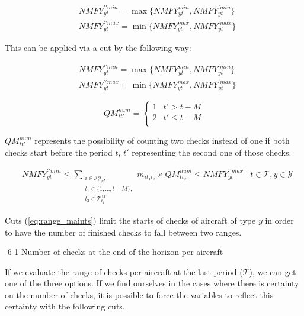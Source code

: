 \documentclass[a4paper,onecolumn,fleqn]{article}
\makeatletter
\renewcommand\section{\@startsection{section}{1}{\z@}%
                       {-6\p@ \@plus -0\p@ \@minus -0\p@}%
                       {2\p@ \@plus 0\p@ \@minus 0\p@}%
                       {\normalsize\textbf}}
\renewcommand\section{\@startsection{section}{2}{\z@}%
                       {-6\p@ \@plus -0\p@ \@minus -0\p@}%
                       {2\p@ \@plus 0\p@ \@minus 0\p@}%
                       {\normalsize\textbf}}
\renewcommand\section{\@startsection{section}{3}{\z@}%
                       {-6\p@ \@plus -0\p@ \@minus -0\p@}%
                       {1\p@ \@plus 0\p@ \@minus 0\p@}%
                       {\normalsize\itshape\bfseries}}
\makeatother
\begin{document}
\begin{align}
  & NMFY^{\prime\prime min}_{yt} = \max\{NMFY^{min}_{yt}, NMFY^{\prime min}_{yt}\} \\ 
  & NMFY^{\prime\prime max}_{yt} = \min\{NMFY^{max}_{yt}, NMFY^{\prime max}_{yt}\}
\end{align}

This can be applied via a cut by the following way:

\begin{align}
  & NMFY^{\prime\prime min}_{yt} = \max\{NMFY^{min}_{yt}, NMFY^{\prime min}_{yt}\} \\ 
  & NMFY^{\prime\prime max}_{yt} = \min\{NMFY^{max}_{yt}, NMFY^{\prime max}_{yt}\}
\end{align}

\[
  QM^{num}_{tt'} = 
  \begin{cases} 
   1 & t' > t - M \\
   2 & t' \le t - M \\
  \end{cases} 
\]

$QM^{num}_{tt'}$ represents the possibility of counting two checks instead of one if both checks start before the period $t$, $t'$ representing the second one of those checks. 

\begin{align}
  & NMFY^{\prime\prime min}_{yt} \le \sum_{\substack{i \in \mathcal{IY}_y, \\ t_1 \in \{1, \ldots, t - M\}, \\ t_2 \in \mathcal{T}^M_{t_1}}} m_{it_1t_2} \times QM^{num}_{tt_2} \le NMFY^{\prime\prime max}_{yt}
      & t \in \mathcal{T}, y \in \mathcal{Y} \label{eq:range_maints}
\end{align}

Cuts (\ref{eq:range_maints}) limit the starts of checks of aircraft of type $y$ in order to have the number of finished checks to fall between two ranges.

\section{Number of checks at the end of the horizon per aircraft}

If we evaluate the range of checks per aircraft at the last period ($\mathcal{T}$), we can get one of the three options. If we find ourselves in the cases where there is certainty on the number of checks, it is possible to force the variables to reflect this certainty with the following cuts.
\end{document}
